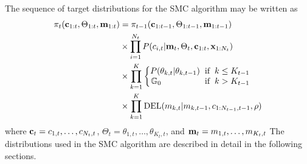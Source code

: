 \documentclass[smallcondensed, final]{svjour3}
\begin{document}
The sequence of target distributions for the SMC algorithm may be written as
\begin{equation}
\begin{split}
\pi_{t}(\bold{c}_{1:t}, \Theta_{1:t}, \bold{m}_{1:t}) & =  \pi_{t-1}(\bold{c}_{1:t-1}, \Theta_{1:t-1}, \bold{m}_{1:t-1})\\
& \times \prod_{i=1}^{N_{t}} P(c_{i,t} | \bold{m}_{t}, \Theta_{t}, \bold{c}_{1:t}, \bold{x}_{1:N_{t}}) \\
& \times \prod_{k=1}^{K} 
\begin{cases}
\begin{split}
P(\theta_{k,t} | \theta_{k,t-1}) \hspace{2mm} & \text{if} \hspace{2mm} k \leq K_{t-1} \\
\mathbb{G}_{0} \hspace{18mm} & \text{if} \hspace{2mm} k > K_{t-1}
\end{split}
\end{cases} \\
& \times \prod_{k=1}^{K} \text{DEL}(m_{k,t} | m_{k,t-1}, c_{1:N_{t-1}, t-1}, \rho)
\end{split}
\end{equation}
where $\bold{c}_{t} = c_{1,t}, \ldots, c_{N_{t}, t}$, $\Theta_{t} = \theta_{1,t}, \ldots, \theta_{K_{t}, t}$, and $\bold{m}_{t} = m_{1,t}, \ldots, m_{K_{t}, t}$ The distributions used in the SMC algorithm are described in detail in the following sections.
\end{document}
